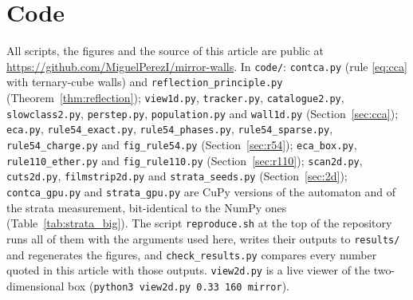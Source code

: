 \documentclass[11pt,a4paper]{article}
\theoremstyle{definition}
\theoremstyle{remark}
\begin{document}
\section*{Code}\sloppy
All scripts, the figures and the source of this article are public at
\url{https://github.com/MiguelPerezI/mirror-walls}. In \texttt{code/}:
\texttt{contca.py} (rule \eqref{eq:cca} with ternary-cube walls) and
\texttt{reflection\_principle.py} (Theorem~\ref{thm:reflection});
\texttt{view1d.py}, \texttt{tracker.py}, \texttt{catalogue2.py},
\texttt{slowclass2.py}, \texttt{perstep.py}, \texttt{population.py} and
\texttt{wall1d.py} (Section~\ref{sec:cca}); \texttt{eca.py},
\texttt{rule54\_exact.py}, \texttt{rule54\_phases.py},
\texttt{rule54\_sparse.py}, \texttt{rule54\_charge.py} and
\texttt{fig\_rule54.py} (Section~\ref{sec:r54}); \texttt{eca\_box.py},
\texttt{rule110\_ether.py} and \texttt{fig\_rule110.py}
(Section~\ref{sec:r110}); \texttt{scan2d.py}, \texttt{cuts2d.py},
\texttt{filmstrip2d.py} and \texttt{strata\_seeds.py}
(Section~\ref{sec:2d}); \texttt{contca\_gpu.py} and
\texttt{strata\_gpu.py} are CuPy versions of the automaton and of the
strata measurement, bit-identical to the NumPy ones
(Table~\ref{tab:strata_big}). The script \texttt{reproduce.sh} at the top
of the repository runs all of them with the arguments used here, writes
their outputs to \texttt{results/} and regenerates the figures, and
\texttt{check\_results.py} compares every number quoted in this article
with those outputs. \texttt{view2d.py} is a live viewer of the
two-dimensional box (\texttt{python3 view2d.py 0.33 160 mirror}).
\end{document}
